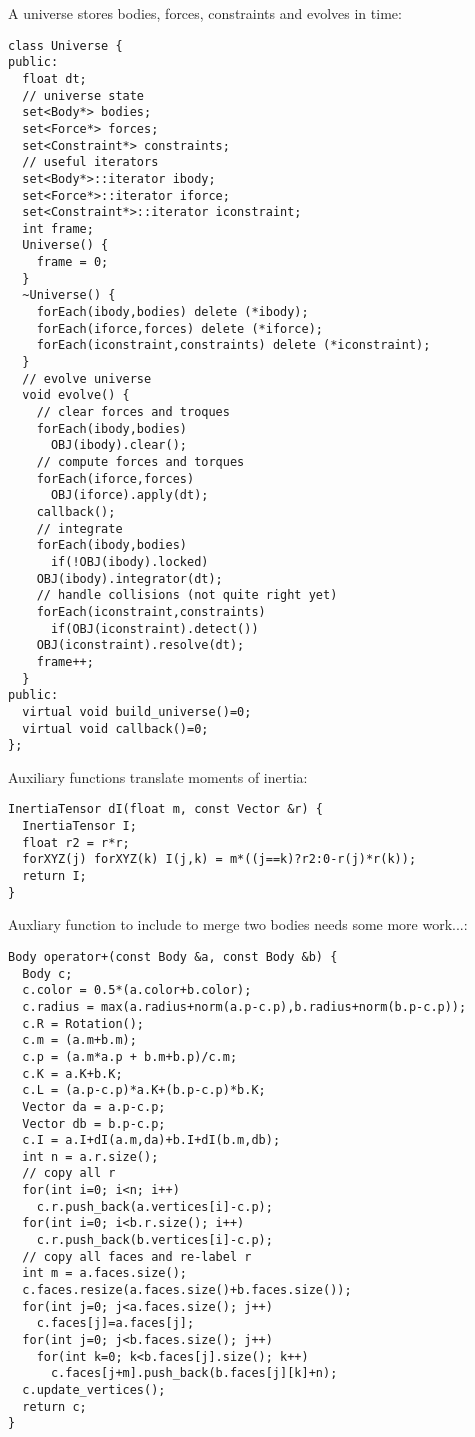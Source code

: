 \noindent
A universe stores bodies, forces, constraints
and evolves in time: \begin{lstlisting}
class Universe {
public:
  float dt;
  // universe state
  set<Body*> bodies;
  set<Force*> forces;
  set<Constraint*> constraints;
  // useful iterators
  set<Body*>::iterator ibody;
  set<Force*>::iterator iforce;
  set<Constraint*>::iterator iconstraint;
  int frame;
  Universe() {
    frame = 0;
  }
  ~Universe() { 
    forEach(ibody,bodies) delete (*ibody);
    forEach(iforce,forces) delete (*iforce);
    forEach(iconstraint,constraints) delete (*iconstraint);
  }
  // evolve universe
  void evolve() {    
    // clear forces and troques
    forEach(ibody,bodies)
      OBJ(ibody).clear();
    // compute forces and torques
    forEach(iforce,forces)
      OBJ(iforce).apply(dt);
    callback();
    // integrate
    forEach(ibody,bodies)
      if(!OBJ(ibody).locked)
	OBJ(ibody).integrator(dt);
    // handle collisions (not quite right yet)
    forEach(iconstraint,constraints)
      if(OBJ(iconstraint).detect())
	OBJ(iconstraint).resolve(dt);
    frame++;
  }
public:
  virtual void build_universe()=0;
  virtual void callback()=0;
};
\end{lstlisting}
\noindent
Auxiliary functions translate moments of inertia: \begin{lstlisting}
InertiaTensor dI(float m, const Vector &r) {
  InertiaTensor I;
  float r2 = r*r;
  forXYZ(j) forXYZ(k) I(j,k) = m*((j==k)?r2:0-r(j)*r(k));
  return I;
}
\end{lstlisting}
\noindent
Auxliary function to include to merge two bodies
needs some more work...: \begin{lstlisting}
Body operator+(const Body &a, const Body &b) {
  Body c;
  c.color = 0.5*(a.color+b.color);
  c.radius = max(a.radius+norm(a.p-c.p),b.radius+norm(b.p-c.p));
  c.R = Rotation();
  c.m = (a.m+b.m);
  c.p = (a.m*a.p + b.m+b.p)/c.m;
  c.K = a.K+b.K;
  c.L = (a.p-c.p)*a.K+(b.p-c.p)*b.K;
  Vector da = a.p-c.p;
  Vector db = b.p-c.p;
  c.I = a.I+dI(a.m,da)+b.I+dI(b.m,db);
  int n = a.r.size();
  // copy all r
  for(int i=0; i<n; i++)
    c.r.push_back(a.vertices[i]-c.p);
  for(int i=0; i<b.r.size(); i++)
    c.r.push_back(b.vertices[i]-c.p);
  // copy all faces and re-label r  
  int m = a.faces.size();
  c.faces.resize(a.faces.size()+b.faces.size());
  for(int j=0; j<a.faces.size(); j++)
    c.faces[j]=a.faces[j];
  for(int j=0; j<b.faces.size(); j++)
    for(int k=0; k<b.faces[j].size(); k++)
      c.faces[j+m].push_back(b.faces[j][k]+n);  
  c.update_vertices();
  return c;
}
\end{lstlisting}
